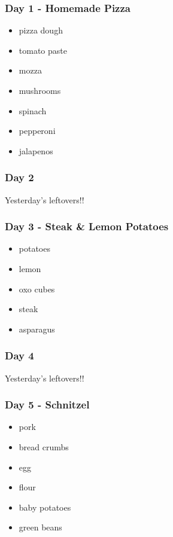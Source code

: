 \documentclass[11pt, a4paper]{article}
\begin{document}
\subsubsection{Day 1 - Homemade Pizza}
\vspace{1pc}
\begin{itemize}
\item pizza dough
\item tomato paste
\item mozza
\item mushrooms
\item spinach
\item pepperoni
\item jalapenos
\end{itemize}

\subsubsection{Day 2}
\vspace{1pc}
Yesterday's leftovers!!

\subsubsection{Day 3 - Steak \& Lemon Potatoes}
\vspace{1pc}
\begin{itemize}
\item potatoes
\item lemon
\item oxo cubes
\item steak
\item asparagus
\end{itemize}

\subsubsection{Day 4}
\vspace{1pc}
Yesterday's leftovers!!

\subsubsection{Day 5 - Schnitzel}
\vspace{1pc}
\begin{itemize}
\item pork
\item bread crumbs
\item egg
\item flour
\item baby potatoes
\item green beans
\end{itemize}
\end{document}
